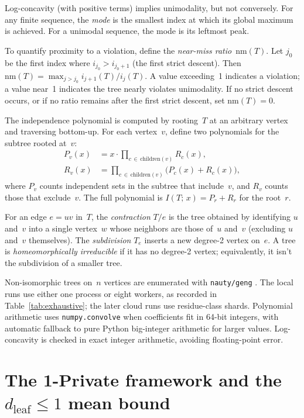 \documentclass[12pt,oneside]{article}
\theoremstyle{remark}
\newcommand{\nm}{\mathrm{nm}}             %
\newcommand{\dleaf}{d_{\mathrm{leaf}}}    %
\begin{document}
Log-concavity (with positive terms) implies unimodality, but not conversely.
For any finite sequence, the \emph{mode} is the smallest index at which its global maximum is achieved.
For a unimodal sequence, the mode is its leftmost peak.

To quantify proximity to a violation, define the \emph{near-miss ratio}~$\nm(T)$.
Let $j_0$ be the first index where $i_{j_0} > i_{j_0+1}$ (the first strict descent).
Then $\nm(T) = \max_{j > j_0} i_{j+1}(T)/i_j(T)$.
A value exceeding~1 indicates a violation; a value near~1 indicates the tree nearly violates unimodality.
If no strict descent occurs, or if no ratio remains after the first strict descent, set $\nm(T)=0$.

The independence polynomial is computed by rooting~$T$ at an arbitrary vertex and traversing bottom-up.
For each vertex~$v$, define two polynomials for the subtree rooted at~$v$:
\begin{align}
  P_v(x) &= x \cdot \prod_{c \,\in\, \mathrm{children}(v)} R_c(x), \label{eq:Pv}\\
  R_v(x) &= \prod_{c \,\in\, \mathrm{children}(v)} \bigl(P_c(x) + R_c(x)\bigr), \label{eq:Rv}
\end{align}
where $P_v$ counts independent sets in the subtree that include~$v$, and $R_v$ counts those that exclude~$v$.
The full polynomial is $I(T;\, x) = P_r + R_r$ for the root~$r$.

For an edge $e = uv$ in~$T$, the \emph{contraction} $T/e$ is the tree obtained by identifying $u$ and~$v$ into a single vertex~$w$ whose neighbors are those of~$u$ and~$v$ (excluding $u$ and~$v$ themselves).
The \emph{subdivision} $T_e$ inserts a new degree-2 vertex on~$e$.
A tree is \emph{homeomorphically irreducible} if it has no degree-2 vertex; equivalently, it isn't the subdivision of a smaller tree.

Non-isomorphic trees on~$n$ vertices are enumerated with \texttt{nauty/geng} \citep{mckay2014}.
The local runs use either one process or eight workers, as recorded in Table~\ref{tab:exhaustive}; the later cloud runs use residue-class shards.
Polynomial arithmetic uses \texttt{numpy.convolve} when coefficients fit in 64-bit integers, with automatic fallback to pure Python big-integer arithmetic for larger values.
Log-concavity is checked in exact integer arithmetic, avoiding floating-point error.


\section{The 1-Private framework and the \texorpdfstring{$\dleaf \le 1$}{d\_leaf ≤ 1} mean bound}\label{sec:reduction}
\end{document}
